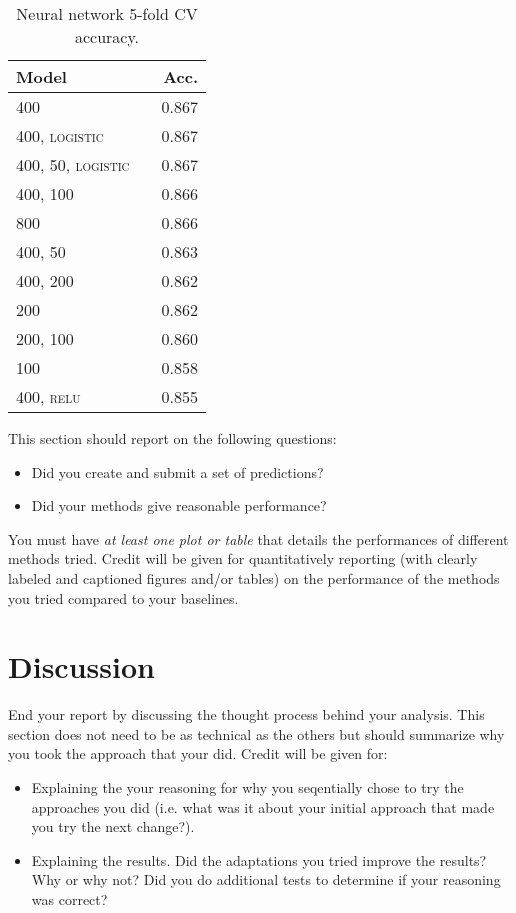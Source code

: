 \documentclass[11pt]{article}
\begin{document}
\begin{table}
	\centering
	\begin{tabular}{llr}
		\toprule
		Model &  & Acc. \\
		\midrule
		\textsc{400} & & 0.867 \\
		\textsc{400, logistic} & & 0.867 \\
		\textsc{400, 50, logistic} & & 0.867  \\
		\textsc{400, 100} & & 0.866 \\
		\textsc{800} & & 0.866 \\
		\textsc{400, 50} & & 0.863  \\
		\textsc{400, 200} & & 0.862 \\
		\textsc{200} & & 0.862 \\
		\textsc{200, 100} & & 0.860 \\
		\textsc{100} & & 0.858 \\
		\textsc{400, relu} & & 0.855 \\
		\bottomrule
	\end{tabular}
	\caption{Neural network 5-fold CV accuracy.}
\end{table}

\pagebreak

This section should report on the following questions: 

\begin{itemize}
\item Did you create and submit a set of predictions? 
  

\item  Did your methods give reasonable performance?  
\end{itemize}

\noindent You must have \textit{at least one plot or table}
that details the performances of different methods tried. 
Credit will be given for quantitatively reporting (with clearly
labeled and captioned figures and/or tables) on the performance of the
methods you tried compared to your baselines.



\section{Discussion} 


End your report by discussing the thought process behind your
analysis. This section does not need to be as technical as the others 
but should summarize why you took the approach that your did. Credit will be given for:

  \begin{itemize}
  \item Explaining the your reasoning for why you seqentially chose to
    try the approaches you did (i.e. what was it about your initial
    approach that made you try the next change?).  
  \item Explaining the results.  Did the adaptations you tried improve
    the results?  Why or why not?  Did you do additional tests to
    determine if your reasoning was correct?  
  \end{itemize}
 
\end{document}
